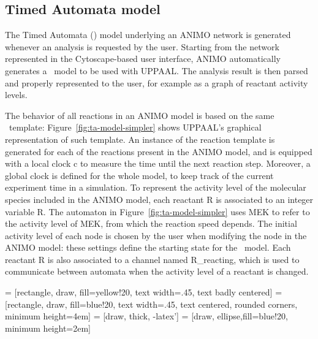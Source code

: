 \subsection{Timed Automata model}
The Timed Automata (\tas) model underlying an ANIMO network is generated whenever an analysis is requested by the user.
Starting from the network represented in the Cytoscape-based user interface, ANIMO automatically generates a \tas\ model
to be used with UPPAAL. The analysis result is then parsed and properly represented to the user, for example
as a graph of reactant activity levels.

The behavior of all reactions in an ANIMO model is based on the same \ta\ template: Figure~\ref{fig:ta-model-simpler}
shows UPPAAL's graphical representation of such template. An instance of the reaction template is generated for each
of the reactions present in the ANIMO model, and is equipped with a local clock {\sf c} to measure the time until
the next reaction step. Moreover, a global clock is defined for the whole model, to keep track of the current experiment time
in a simulation. To represent the activity level of the molecular species included in the ANIMO model, each
reactant R is associated to an integer variable {\sf R}.
The automaton in Figure~\ref{fig:ta-model-simpler} uses {\sf MEK} to refer to the activity level of MEK, from which the reaction speed depends.
The initial activity level of each node is chosen by the user when modifying the node
in the ANIMO model: these settings define the starting state for the \tas\ model.
Each reactant R is also associated to a channel named {\sf R\_reacting}, which is
used to communicate between automata when the activity level of a reactant is changed.



 = [rectangle, draw, fill=yellow!20, text width=.45\textwidth, text badly centered]
 = [rectangle, draw, fill=blue!20,
    text width=.45\textwidth, text centered, rounded corners, minimum height=4em]
 = [draw, thick, -latex']
 = [draw, ellipse,fill=blue!20, minimum height=2em]
\def\svgwidth{.8\textwidth}
\newsavebox{\mysquareLow}
\savebox{\mysquareLow}{%
  \raisebox{-0.08em}{%
    \textcolor{black}{%
      \rule{.7em}{.7em}%
    }%
    \hspace{-.65em}%
    \raisebox{.05em}{%
      \textcolor{lowActivity}{%
	\rule{.6em}{.6em}%
      }%
    }%
  }%
}
\newsavebox{\mysquareHigh}
\savebox{\mysquareHigh}{%
  \raisebox{-0.08em}{%
    \textcolor{black}{%
      \rule{.7em}{.7em}%
    }%
    \hspace{-.65em}%
    \raisebox{.05em}{%
      \textcolor{highActivity}{%
	\rule{.6em}{.6em}%
      }%
    }%
  }%
}

